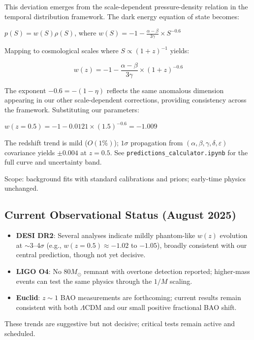 This deviation emerges from the scale-dependent pressure-density relation in the temporal distribution framework. The dark energy equation of state becomes:

$p(S) = w(S)\rho(S)$, where $w(S) = -1 - \frac{\alpha-\beta}{3\gamma} \times S^{-0.6}$

Mapping to cosmological scales where $S \propto (1+z)^{-1}$ yields:

\begin{equation}
w(z) = -1 - \frac{\alpha-\beta}{3\gamma} \times (1+z)^{-0.6}
\end{equation}

The exponent $-0.6 = -(1-\eta)$ reflects the same anomalous dimension appearing in our other scale-dependent corrections, providing consistency across the framework. Substituting our parameters:

$w(z=0.5) = -1 - 0.0121 \times (1.5)^{-0.6} = -1.009$

The redshift trend is mild ($O(1\%)$); $1\sigma$ propagation from $(\alpha,\beta,\gamma,\delta,\varepsilon)$ covariance yields $\pm0.004$ at $z=0.5$. See \texttt{predictions\_calculator.ipynb} for the full curve and uncertainty band.

Scope: background fits with standard calibrations and priors; early-time physics unchanged.

\subsection{Current Observational Status (August 2025)}

\begin{itemize}
\item \textbf{DESI DR2}: Several analyses indicate mildly phantom-like $w(z)$ evolution at $\sim3$--4$\sigma$ (e.g., $w(z=0.5) \approx -1.02$ to $-1.05$), broadly consistent with our central prediction, though not yet decisive.

\item \textbf{LIGO O4}: No $80 M_\odot$ remnant with overtone detection reported; higher-mass events can test the same physics through the $1/M$ scaling.

\item \textbf{Euclid}: $z \sim 1$ BAO measurements are forthcoming; current results remain consistent with both $\Lambda$CDM and our small positive fractional BAO shift.
\end{itemize}

These trends are suggestive but not decisive; critical tests remain active and scheduled.

